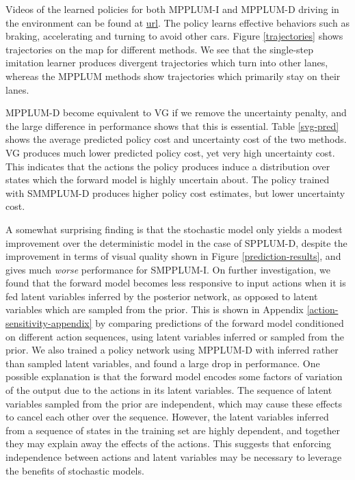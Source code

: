 \documentclass{article} %
\begin{document}
Videos of the learned policies for both MPPLUM-I and MPPLUM-D driving in the environment can be found at \url{url}.
The policy learns effective behaviors such as braking, accelerating and turning to avoid other cars.
Figure \ref{trajectories} shows trajectories on the map for different methods. We see that the single-step imitation learner produces divergent trajectories which turn into other lanes, whereas the MPPLUM methods show trajectories which primarily stay on their lanes. 

MPPLUM-D become equivalent to VG if we remove the uncertainty penalty, and the large difference in performance shows that this is essential.
Table \ref{svg-pred} shows the average predicted policy cost and uncertainty cost of the two methods.
VG produces much lower predicted policy cost, yet very high uncertainty cost. This indicates that the actions the policy produces induce a distribution over states which the forward model is highly uncertain about. The policy trained with SMMPLUM-D produces higher policy cost estimates, but lower uncertainty cost.

A somewhat surprising finding is that the stochastic model only yields a modest improvement over the deterministic model in the case of SPPLUM-D, despite the improvement in terms of visual quality shown in Figure \ref{prediction-results}, and gives much \textit{worse} performance for SMPPLUM-I.
On further investigation, we found that the forward model becomes less responsive to input actions when it is fed latent variables inferred by the posterior network, as opposed to latent variables which are sampled from the prior. This is shown in Appendix \ref{action-sensitivity-appendix} by comparing predictions of the forward model conditioned on different action sequences, using latent variables inferred or sampled from the prior. We also trained a policy network using MPPLUM-D with inferred rather than sampled latent variables, and found a large drop in performance.
One possible explanation is that the forward model encodes some factors of variation of the output due to the actions in its latent variables.
The sequence of latent variables sampled from the prior are independent, which may cause these effects to cancel each other over the sequence. However, the latent variables inferred from a sequence of states in the training set are highly dependent, and together they may explain away the effects of the actions.
This suggests that enforcing independence between actions and latent variables may be necessary to leverage the benefits of stochastic models.
\end{document}
